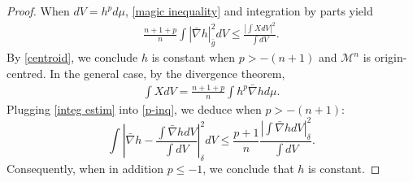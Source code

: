 \documentclass[10pt,a4paper]{amsart}
\newcommand{\M}{\mathcal{M}}
\begin{document}
\begin{proof}
When $dV = h^p d\mu$, \autoref{magic inequality} and integration by parts yield
\begin{align} \label{p-inq}
\frac{n+1+p}{n}\int |\bar{\nabla} h|_{\bar{g}}^2dV\leq  \frac{\left|\int XdV\right|^2}{\int dV}.
\end{align}
By \autoref{centroid}, we conclude $h$ is constant when $p > -(n+1)$ and $\M^n$ is origin-centred. In the general case, by the divergence theorem,
\begin{align}\label{integ estim}
\int X dV =\frac{n+1+p}{n}\int h^p\bar{\nabla}h d\mu.
\end{align}
Plugging \eqref{integ estim} into \eqref{p-inq}, we deduce when $p > -(n+1)$:
\[\int \left|\bar{\nabla}h-\frac{\int \bar{\nabla}hdV}{\int dV}\right|_{\delta}^2dV\leq \frac{p+1}{n}\frac{|\int \bar{\nabla}hdV|_{\delta}^2}{\int dV}.\]
Consequently, when in addition $p \leq -1$, we conclude that $h$ is constant.
\end{proof}
\end{document}
